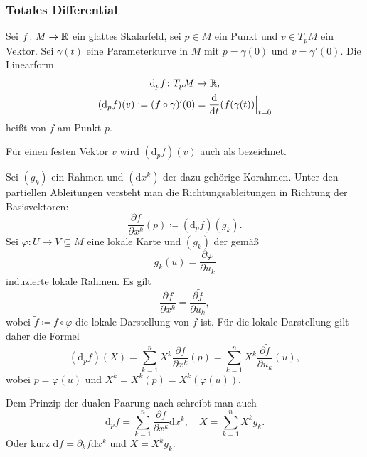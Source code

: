 \subsubsection{Totales Differential}
\begin{definition}
Sei $f\colon M\to\mathbb R$ ein glattes Skalarfeld, sei $p\in M$ ein Punkt
und $v\in T_p M$ ein Vektor. Sei $\gamma(t)$ eine Parameterkurve in $M$
mit $p=\gamma(0)$ und $v=\gamma'(0)$. Die Linearform%
\begin{gather}
\mathrm d_p f\colon T_p M\to\mathbb R,\\
(\mathrm d_p f)(v) := (f\circ\gamma)'(0)
= \frac{\mathrm d}{\mathrm dt}(f(\gamma(t))\Big|_{t=0}
\end{gather}
heißt  von $f$ am Punkt $p$.
\end{definition}
\begin{definition}[Richtungsableitung]
Für einen festen Vektor $v$ wird $(\mathrm d_p f)(v)$ auch als
 bezeichnet.
\end{definition}
Sei $(g_k)$ ein Rahmen und $(\mathrm dx^k)$ der dazu gehörige
Korahmen. Unter den partiellen Ableitungen versteht man die
Richtungsableitungen in Richtung der Basisvektoren:%
\begin{equation}
\frac{\partial f}{\partial x^k}(p)\coloneq (\mathrm d_p f)(g_k).
\end{equation}
Sei $\varphi\colon U\to V\subseteq M$ eine lokale Karte und
$(g_k)$ der gemäß%
\begin{equation}
g_k(u) = \frac{\partial\varphi}{\partial u_k}
\end{equation}
induzierte lokale Rahmen. Es gilt
\begin{equation}
\frac{\partial f}{\partial x^k} = \frac{\partial\tilde f}{\partial u_k},
\end{equation}
wobei $\tilde f\coloneq f\circ\varphi$ die
lokale Darstellung von $f$ ist. Für die lokale Darstellung gilt daher
die Formel
\begin{equation}
(\mathrm d_p f)(X) = \sum_{k=1}^n X^k\frac{\partial f}{\partial x^k}(p)
= \sum_{k=1}^n X^k\frac{\partial\tilde f}{\partial u_k}(u),
\end{equation}
wobei $p=\varphi(u)$ und $X^k=X^k(p)=X^k(\varphi(u))$.

Dem Prinzip der dualen Paarung nach schreibt man auch%
\begin{equation}
\mathrm d_p f = \sum_{k=1}^n \frac{\partial f}{\partial x^k} \mathrm dx^k,\quad
X = \sum_{k=1}^n X^k g_k.
\end{equation}
Oder kurz $\mathrm df = \partial_k f\mathrm dx^k$ und $X=X^k g_k$.

